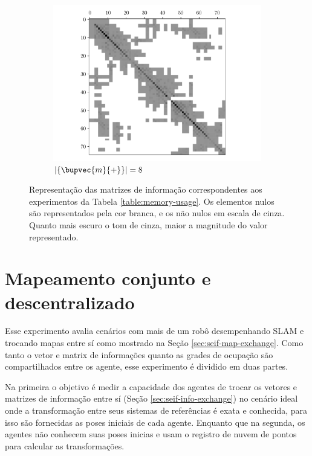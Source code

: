 \begin{figure}
\begin{subfigure}{0.49\textwidth}
    \includegraphics[width=\textwidth]{figs/seif-8-info-matrix.pdf} 
    \caption{$\lvert\{ \bupvec{m}{+} \}\rvert = 8$}
    \label{fig:seif-info-matrix-08}
  \end{subfigure}
  \caption{Representação das matrizes de informação correspondentes aos experimentos da Tabela \ref{table:memory-usage}. Os elementos nulos são representados pela cor branca, e os não nulos em escala de cinza. Quanto mais escuro o tom de cinza, maior a magnitude do valor representado.}
  \label{fig:seif-info-matrix-memory}
\end{figure}


\section{Mapeamento conjunto e descentralizado}
Esse experimento avalia cenários com mais de um robô desempenhando SLAM 
e trocando mapas entre sí como mostrado na Seção \ref{sec:seif-map-exchange}. Como tanto o vetor e matrix de informações 
quanto as grades de ocupação são compartilhados entre os agente, esse 
experimento é dividido em duas partes.

Na primeira o objetivo é medir a 
capacidade dos agentes de trocar os vetores e matrizes de informação 
entre sí (Seção \ref{sec:seif-info-exchange}) no cenário ideal onde a
transformação entre seus sistemas de referências é exata e conhecida, para isso são fornecidas as poses iniciais de cada agente. Enquanto que 
na segunda, os agentes não conhecem suas poses inicias e usam o 
registro de nuvem de pontos para calcular as transformações.

